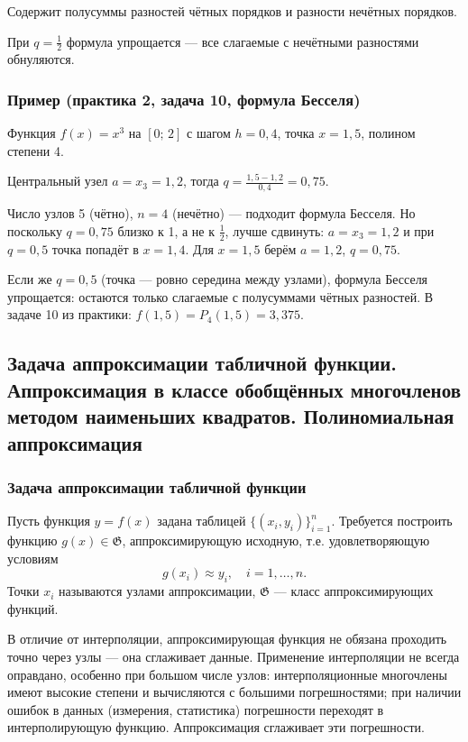 Содержит полусуммы разностей чётных порядков и разности нечётных порядков.

При $q = \frac{1}{2}$ формула упрощается --- все слагаемые с нечётными разностями обнуляются.

\subsubsection*{Пример (практика 2, задача 10, формула Бесселя)}

Функция $f(x) = x^3$ на $[0;\, 2]$ с шагом $h = 0{,}4$, точка $x = 1{,}5$, полином степени 4.

Центральный узел $a = x_3 = 1{,}2$, тогда $q = \frac{1{,}5 - 1{,}2}{0{,}4} = 0{,}75$.

Число узлов 5 (чётно), $n = 4$ (нечётно) --- подходит формула Бесселя. Но поскольку $q = 0{,}75$ близко к 1, а не к $\frac{1}{2}$, лучше сдвинуть: $a = x_3 = 1{,}2$ и при $q = 0{,}5$ точка попадёт в $x = 1{,}4$. Для $x = 1{,}5$ берём $a = 1{,}2$, $q = 0{,}75$.

Если же $q = 0{,}5$ (точка --- ровно середина между узлами), формула Бесселя упрощается: остаются только слагаемые с полусуммами чётных разностей. В задаче 10 из практики: $f(1{,}5) = P_4(1{,}5) = 3{,}375$.

\subsection{Задача аппроксимации табличной функции. Аппроксимация в классе обобщённых многочленов методом наименьших квадратов. Полиномиальная аппроксимация}

\subsubsection*{Задача аппроксимации табличной функции}

Пусть функция $y = f(x)$ задана таблицей $\{(x_i, y_i)\}_{i=1}^{n}$. Требуется построить функцию $g(x) \in \mathfrak{G}$, аппроксимирующую исходную, т.е. удовлетворяющую условиям
\[
    g(x_i) \approx y_i, \quad i = 1, \ldots, n.
\]
Точки $x_i$ называются узлами аппроксимации, $\mathfrak{G}$ --- класс аппроксимирующих функций.

В отличие от интерполяции, аппроксимирующая функция не обязана проходить точно через узлы --- она сглаживает данные. Применение интерполяции не всегда оправдано, особенно при большом числе узлов: интерполяционные многочлены имеют высокие степени и вычисляются с большими погрешностями; при наличии ошибок в данных (измерения, статистика) погрешности переходят в интерполирующую функцию. Аппроксимация сглаживает эти погрешности.

